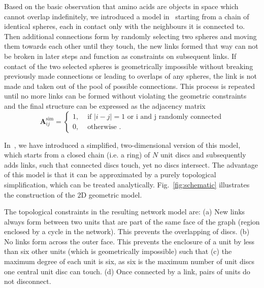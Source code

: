 \documentclass[
reprint,
twocolumn,
amsmath,amssymb,superscriptaddress,aps,
pre]{revtex4-1}
\begin{document}
Based on the basic observation that amino acids are objects in space which cannot overlap indefinitely, we introduced a model in~\cite{molkenthin2020self} starting from a chain of identical spheres, each in contact only with the neighbours it is connected to. Then additional connections form by randomly selecting two spheres and moving them towards each other until they touch, the new links formed that way can not be broken in later steps and function as constraints on subsequent links. If contact of the two selected spheres is geometrically impossible without breaking previously made connections or leading to overlaps of any spheres, the link is not made and taken out of the pool of possible connections. This process is repeated until no more links can be formed without violating the geometric constraints and the final structure can be expressed as the adjacency matrix
\begin{equation}
  \mathbf{A}^{\mathrm{sim}}_{ij}=
  \begin{cases}
   1, & \text{ if }|i-j|=1 \text{ or i and j  randomly connected} \\
      0, & \text{ otherwise }  .
      \end{cases}
    \label{eq:aij}
\end{equation}

In~\cite{molkenthin2016scaling}, we have introduced a simplified, two-dimensional version of this model, which starts from a closed chain (i.e. a ring) of $N$ unit discs and subsequently adds links, such that connected discs touch, yet no discs intersect. The advantage of this model is that it can be approximated by a purely topological simplification, which can be treated analytically. Fig.~\ref{fig:schematic} illustrates the construction of the 2D geometric model.




The topological constraints in the resulting network model are:
(a) New links always form between two units that are part of the same face of the graph (region enclosed by a cycle in the network). This prevents the overlapping of discs. (b) No links form across the outer face. This prevents the enclosure of a unit by less than six other units (which is geometrically impossible) such that (c) the maximum degree of each unit is six, as six is the maximum number of unit discs one central unit disc can touch. (d) Once connected by a link, pairs of units do not disconnect.

\end{document}
